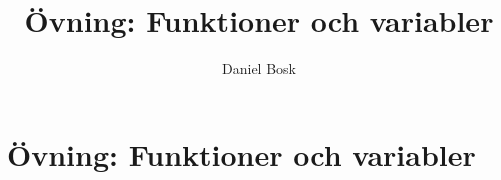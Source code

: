 \documentclass[a4paper,10pt,oneside,openright,
               oldfontcommands]{memoir}
\begin{document}
\title{%
  Övning: Funktioner och variabler
}
\author{Daniel Bosk}

\maketitle

\begin{abstract}
  
\end{abstract}

\clearpage

\tableofcontents*

\chapter{Övning: Funktioner och variabler}



\appendix


\printbibliography
\end{document}
